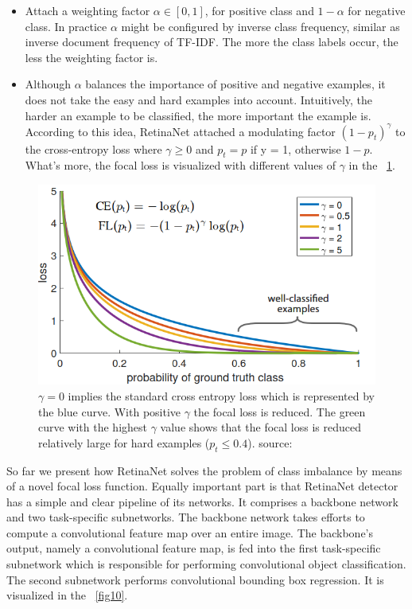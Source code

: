 \documentclass[runningheads]{llncs}
\begin{document}
\begin{itemize}
	\item Attach a weighting factor $\alpha \in [0,1]$, for positive class and $1 - \alpha$ for negative class. In practice $\alpha$ might be configured by inverse class frequency, similar as inverse document frequency of TF-IDF. The more the class labels occur, the less the weighting factor is.
	\item Although $\alpha$ balances the importance of positive and negative examples, it does not take the easy and hard examples into account. Intuitively, the harder an example to be classified, the more important the example is. According to this idea, RetinaNet attached a modulating factor $(1-p_t)^\gamma$ to the cross-entropy loss where $\gamma \geq 0$ and $p_t = p$ if y = 1, otherwise $1-p$. What’s more, the focal loss is visualized with different values of $\gamma$ in the ~\ref{fig9}.
\end{itemize}

\begin{figure}
\includegraphics[width=\textwidth]{figs/loss_with_gammas.png}
\caption{$\gamma = 0$ implies the standard cross entropy loss which is represented by the blue curve. With positive $\gamma$ the focal loss is reduced. The green curve with the highest $\gamma$ value shows that the focal loss is reduced relatively large for hard examples ($p_t \leq 0.4$). source: ~\cite{ref_retinanet}} \label{fig9}
\end{figure}

So far we present how RetinaNet solves the problem of class imbalance by means of a novel focal loss function. Equally important part is that RetinaNet detector has a simple and clear pipeline of its networks. It comprises a backbone network and two task-specific subnetworks. The backbone network takes efforts to compute a convolutional feature map over an entire image. The backbone’s output, namely a convolutional feature map, is fed into the first task-specific subnetwork which is responsible for performing convolutional object classification. The second subnetwork performs convolutional bounding box regression. It is visualized in the ~\ref{fig10}.
\end{document}
